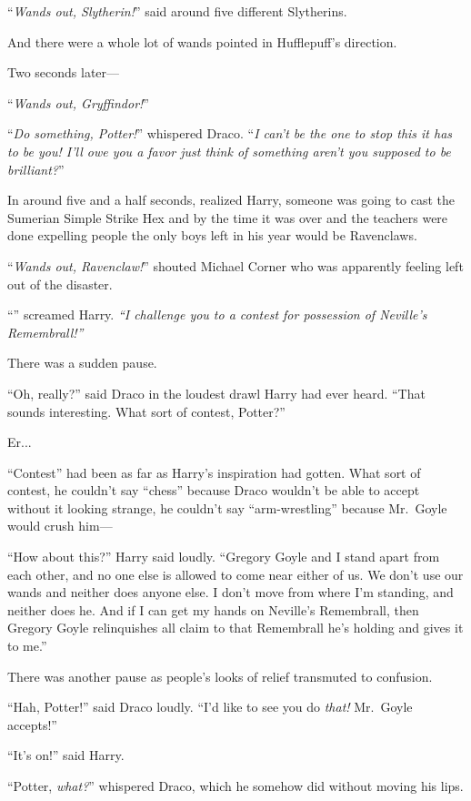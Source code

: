 “\emph{Wands out, Slytherin!}” said around five different Slytherins.

And there were a whole lot of wands pointed in Hufflepuff’s direction.

Two seconds later—

“\emph{Wands out, Gryffindor!}”

“\emph{Do something, Potter!}” whispered Draco. “\emph{I can’t be the one to stop this it has to be you! I’ll owe you a favor just think of something aren’t you supposed to be brilliant?}”

In around five and a half seconds, realized Harry, someone was going to cast the Sumerian Simple Strike Hex and by the time it was over and the teachers were done expelling people the only boys left in his year would be Ravenclaws.

“\emph{Wands out, Ravenclaw!}” shouted Michael Corner who was apparently feeling left out of the disaster.

“” screamed Harry. \emph{“I challenge you to a contest for possession of Neville’s Remembrall!”}

There was a sudden pause.

“Oh, really?” said Draco in the loudest drawl Harry had ever heard. “That sounds interesting. What sort of contest, Potter?”

Er...

“Contest” had been as far as Harry’s inspiration had gotten. What sort of contest, he couldn’t say “chess” because Draco wouldn’t be able to accept without it looking strange, he couldn’t say “arm-wrestling” because Mr.~Goyle would crush him—

“How about this?” Harry said loudly. “Gregory Goyle and I stand apart from each other, and no one else is allowed to come near either of us. We don’t use our wands and neither does anyone else. I don’t move from where I’m standing, and neither does he. And if I can get my hands on Neville’s Remembrall, then Gregory Goyle relinquishes all claim to that Remembrall he’s holding and gives it to me.”

There was another pause as people’s looks of relief transmuted to confusion.

“Hah, Potter!” said Draco loudly. “I’d like to see you do \emph{that!} Mr.~Goyle accepts!”

“It’s on!” said Harry.

“Potter, \emph{what?}” whispered Draco, which he somehow did without moving his lips.

